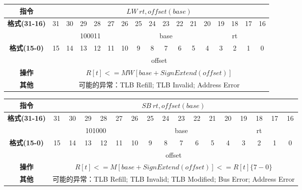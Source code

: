 \documentclass[11pt,utf8]{article}
\begin{document}
\begin{center}
\begin{tabular}{|c|c|c|c|c|c|c|c|c|c|c|c|c|c|c|c|c|}
\hline
\textbf{指令} & \multicolumn{16}{c|}{$LW~rt,offset(base)$} \\
\hline
\multirow{2}{*}{\textbf{格式(31-16)}} & 31 & 30 & 29 & 28 & 27 & 26 & 25 & 24 & 23 & 22 & 21 & 20 & 19 & 18 & 17 & 16 \\ 
\cline{2-17}
& \multicolumn{6}{c|}{100011} & \multicolumn{5}{c|}{base} & \multicolumn{5}{c|}{rt}\\
\hline
\multirow{2}{*}{\textbf{格式(15-0)}} & 15 & 14 & 13 & 12 & 11 & 10 & 9 & 8 & 7 & 6 & 5 & 4 & 3 & 2 & 1 & 0 \\
\cline{2-17}
& \multicolumn{16}{c|}{offset}\\
\hline
\textbf{操作} & \multicolumn{16}{c|}{$R[t]<=MW[base+SignExtend(offset)]$} \\
\hline
\textbf{其他} & \multicolumn{16}{c|}{可能的异常：TLB Refill; TLB Invalid; Address Error} \\
\hline
\end{tabular}
\end{center}

\begin{center}
\begin{tabular}{|c|c|c|c|c|c|c|c|c|c|c|c|c|c|c|c|c|}
\hline
\textbf{指令} & \multicolumn{16}{c|}{$SB~rt,offset(base)$} \\
\hline
\multirow{2}{*}{\textbf{格式(31-16)}} & 31 & 30 & 29 & 28 & 27 & 26 & 25 & 24 & 23 & 22 & 21 & 20 & 19 & 18 & 17 & 16 \\ 
\cline{2-17}
& \multicolumn{6}{c|}{101000} & \multicolumn{5}{c|}{base} & \multicolumn{5}{c|}{rt}\\
\hline
\multirow{2}{*}{\textbf{格式(15-0)}} & 15 & 14 & 13 & 12 & 11 & 10 & 9 & 8 & 7 & 6 & 5 & 4 & 3 & 2 & 1 & 0 \\
\cline{2-17}
& \multicolumn{16}{c|}{offset}\\
\hline
\textbf{操作} & \multicolumn{16}{c|}{$R[t]<=M[base+SignExtend(offset)]<=R[t]\{7-0\}$} \\
\hline
\textbf{其他} & \multicolumn{16}{c|}{可能的异常：TLB Refill; TLB Invalid; TLB Modified; Bus Error; Address Error} \\
\hline
\end{tabular}
\end{center}
\end{document}
